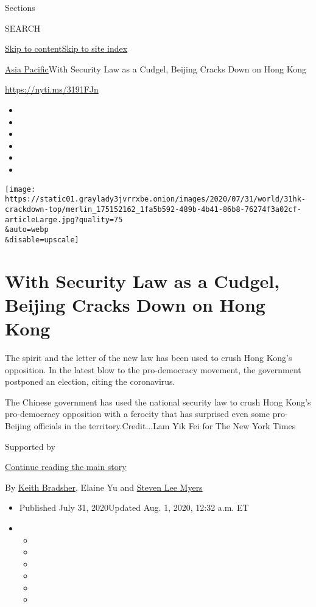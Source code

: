 Sections

SEARCH

\protect\hyperlink{site-content}{Skip to
content}\protect\hyperlink{site-index}{Skip to site index}

\href{/section/world/asia}{Asia Pacific}\textbar{}With Security Law as a
Cudgel, Beijing Cracks Down on Hong Kong

\url{https://nyti.ms/3191FJn}

\begin{itemize}
\item
\item
\item
\item
\item
\item
\end{itemize}

\texttt{[image: https://static01.graylady3jvrrxbe.onion/images/2020/07/31/world/31hk-crackdown-top/merlin\_175152162\_1fa5b592-489b-4b41-86b8-76274f3a02cf-articleLarge.jpg?quality=75\\\&auto=webp\\\&disable=upscale]}

\hypertarget{with-security-law-as-a-cudgel-beijing-cracks-down-on-hong-kong}{%
\section{With Security Law as a Cudgel, Beijing Cracks Down on Hong
Kong}\label{with-security-law-as-a-cudgel-beijing-cracks-down-on-hong-kong}}

The spirit and the letter of the new law has been used to crush Hong
Kong's opposition. In the latest blow to the pro-democracy movement, the
government postponed an election, citing the coronavirus.

The Chinese government has used the national security law to crush Hong
Kong's pro-democracy opposition with a ferocity that has surprised even
some pro-Beijing officials in the territory.Credit...Lam Yik Fei for The
New York Times

Supported by

\protect\hyperlink{after-sponsor}{Continue reading the main story}

By \href{https://www.nytimes3xbfgragh.onion/by/keith-bradsher}{Keith
Bradsher}, Elaine Yu and
\href{https://www.nytimes3xbfgragh.onion/by/steven-lee-myers}{Steven Lee
Myers}

\begin{itemize}
\item
  Published July 31, 2020Updated Aug. 1, 2020, 12:32 a.m. ET
\item
  \begin{itemize}
  \item
  \item
  \item
  \item
  \item
  \item
  \end{itemize}
\end{itemize}

